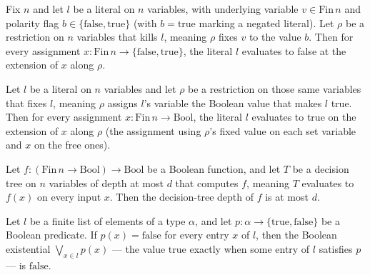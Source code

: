 \begin{lemma}
\label{SwitchingLemma.Literal.killedBy_eval_false}
\leanok
{}
Fix $n$ and let $l$ be a literal on $n$ variables, with underlying variable $v \in
\mathrm{Fin}\,n$ and polarity flag $b \in \{\text{false}, \text{true}\}$ (with $b =
\text{true}$ marking a negated literal). Let $\rho$ be a restriction on $n$ variables
that kills $l$, meaning $\rho$ fixes $v$ to the value $b$. Then for every assignment $x
: \mathrm{Fin}\,n \to \{\text{false}, \text{true}\}$, the literal $l$ evaluates to false
at the extension of $x$ along $\rho$.
\end{lemma}

\begin{lemma}
\label{SwitchingLemma.Literal.fixedBy_eval_true}
\leanok
{}
Let $l$ be a literal on $n$ variables and let $\rho$ be a restriction on those same
variables that fixes $l$, meaning $\rho$ assigns $l$'s variable the Boolean value that
makes $l$ true. Then for every assignment $x : \mathrm{Fin}\,n \to \mathrm{Bool}$, the
literal $l$ evaluates to true on the extension of $x$ along $\rho$ (the assignment using
$\rho$'s fixed value on each set variable and $x$ on the free ones).
\end{lemma}

\begin{lemma}
\label{SwitchingLemma.dtDepth_le_of_tree}
\leanok
{}
Let $f : (\mathrm{Fin}\,n \to \mathrm{Bool}) \to \mathrm{Bool}$ be a Boolean function,
and let $T$ be a decision tree on $n$ variables of depth at most $d$ that computes $f$,
meaning $T$ evaluates to $f(x)$ on every input $x$. Then the decision-tree depth of $f$
is at most $d$.
\end{lemma}

\begin{lemma}
\label{SwitchingLemma.list_any_eq_false}
\leanok
{}
Let $l$ be a finite list of elements of a type $\alpha$, and let $p \colon \alpha \to
\{\mathrm{true}, \mathrm{false}\}$ be a Boolean predicate. If $p(x) = \mathrm{false}$
for every entry $x$ of $l$, then the Boolean existential $\bigvee_{x \in l} p(x)$ — the
value $\mathrm{true}$ exactly when some entry of $l$ satisfies $p$ — is
$\mathrm{false}$.
\end{lemma}

